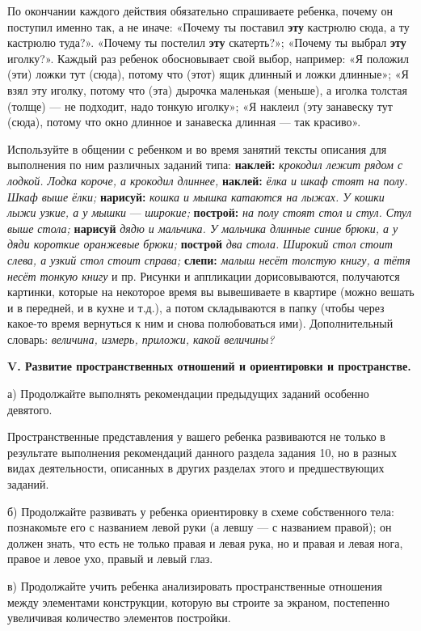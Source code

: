 \documentclass[a5paper]{book}
\renewcommand{\emph}[1]{\textit{#1}}
\begin{document}
По окончании каждого действия обязательно спрашиваете ребенка, почему он
поступил именно так, а не иначе: «Почему ты поставил \textbf{эту}
кастрюлю сюда, а ту кастрюлю туда?». «Почему ты постелил \textbf{эту}
скатерть?»; «Почему ты выбрал \textbf{эту} иголку?». Каждый раз ребенок
обосновывает свой выбор, например: «Я положил (эти) ложки тут (сюда),
потому что (этот) ящик длинный и ложки длинные»; «Я взял эту иголку,
потому что (эта) дырочка маленькая (меньше), а иголка толстая (толще)
--- не подходит, надо тонкую иголку»; «Я наклеил (эту занавеску тут
(сюда), потому что окно длинное и занавеска длинная --- так красиво».

Используйте в общении с ребенком и во время занятий тексты описания для
выполнения по ним различных заданий типа: \textbf{наклей:}
\emph{крокодил лежит рядом с лодкой. Лодка короче, а крокодил длиннее,}
\textbf{наклей:} \emph{ёлка и шкаф стоят на полу. Шкаф выше ёлки;}
\textbf{нарисуй:} \emph{кошка и мышка катаются на лыжах. У кошки лыжи
узкие, а у мышки} --- \emph{широкие;} \textbf{построй:} \emph{на полу
стоят стол и стул. Стул выше стола;} \textbf{нарисуй} \emph{дядю и
мальчика. У мальчика длинные синие брюки, а у дяди короткие оранжевые
брюки;} \textbf{построй} \emph{два стола. Широкий стол стоит слева, а
узкий стол стоит справа;} \textbf{слепи:} \emph{малыш несёт толстую
книгу, а тётя несёт тонкую книгу} и пр. Рисунки и аппликации
дорисовываются, получаются картинки, которые на некоторое время вы
вывешиваете в квартире (можно вешать и в передней, и в кухне и т.д.), а
потом складываются в папку (чтобы через какое-то время вернуться к ним и
снова полюбоваться ими). Дополнительный словарь: \emph{величина, измерь,
приложи, какой величины?}

\textbf{V. Развитие пространственных отношений и ориентировки и
пространстве.}

а) Продолжайте выполнять рекомендации предыдущих заданий особенно
девятого.

Пространственные представления у вашего ребенка развиваются не только в
результате выполнения рекомендаций данного раздела задания 10, но в
разных видах деятельности, описанных в других разделах этого и
предшествующих заданий.

б) Продолжайте развивать у ребенка ориентировку в схеме собственного
тела: познакомьте его с названием левой руки (а левшу --- с названием
правой); он должен знать, что есть не только правая и левая рука, но и
правая и левая нога, правое и левое ухо, правый и левый глаз.

в) Продолжайте учить ребенка анализировать пространственные отношения
между элементами конструкции, которую вы строите за экраном, постепенно
увеличивая количество элементов постройки.
\end{document}
